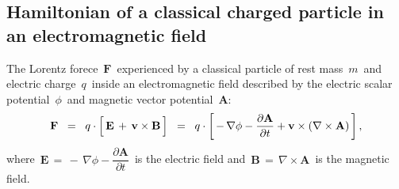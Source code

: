 
\vskip 0.5cm
\subsection{Hamiltonian of a classical charged particle in an electromagnetic field}


\begin{definition}
\mbox{}
\vskip 0.02cm
\noindent
The Lorentz forece \,$\mathbf{F}$\,
experienced by a classical particle
of rest mass \,$m$\, and electric charge \,$q$\,
inside an electromagnetic field described by
the electric scalar potential \,$\phi$\, and
magnetic vector potential \,$\mathbf{A}$:\,
\begin{equation*}
\mathbf{F}
\;\; = \;\;
    q \cdot
    \left[\,
        \mathbf{E}
        \, \overset{{\color{white}.}}{+} \,
        \mathbf{v} \times \mathbf{B} 
        \,\right]
\;\; = \;\;
    q \cdot
    \left[\,
        -\,\nabla\phi
        - \dfrac{\partial\mathbf{A}}{\partial t}
        + \mathbf{v} \times (\nabla \times \mathbf{A})
        \,\right],
\end{equation*}
where
\,$\mathbf{E} \,=\, -\,\nabla\phi - \dfrac{\partial\mathbf{A}}{\partial t}$\,
is the electric field and
\,$\mathbf{B} \,=\, \nabla \times \mathbf{A}$\,
is the magnetic field.
\end{definition}

